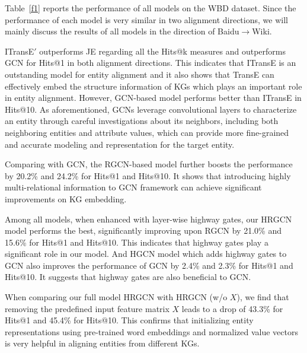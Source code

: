     Table~\ref{f1} reports the performance of all models on the WBD dataset. Since the performance of each model is very similar in two alignment directions, we will mainly discuss the results of all models in the direction of Baidu$\rightarrow$Wiki. 
    
    ITransE$'$ outperforms JE regarding all the Hits@k measures and outperforms GCN for Hits@1 in both alignment directions. This indicates that ITransE is an
outstanding model for entity alignment and it also shows that TransE can effectively embed the structure information of KGs which plays an
important role in entity alignment. However, GCN-based model performs better than ITransE in Hits@10. As aforementioned, GCNs
leverage convolutional layers to characterize an entity through careful investigations about its neighbors, including both neighboring
entities and attribute values, which can provide more fine-grained and accurate modeling and representation for the target entity.


	Comparing with GCN, the RGCN-based model further boosts the performance by 20.2\% and 24.2\% for Hits@1 and Hits@10. It shows that introducing highly multi-relational information to GCN framework can achieve significant improvements on KG embedding.
	
	Among all models, when enhanced with layer-wise highway gates, our HRGCN model performs the best, significantly improving upon RGCN by 21.0\% and 15.6\% for Hits@1 and Hits@10. This indicates that highway gates play a significant role in our model. And HGCN model which adds highway gates to GCN also improves the performance of GCN by 2.4\% and 2.3\% for Hits@1 and Hits@10. It suggests that highway gates are also beneficial to GCN. 
	
	When comparing our full model HRGCN with HRGCN (w/o $X$), we find that removing the predefined input feature matrix $X$ leads to a drop of 43.3\% for Hits@1 and 45.4\% for Hits@10. This confirms that initializing entity representations using pre-trained word embeddings and normalized value vectors is very helpful in aligning entities from different KGs.
	
